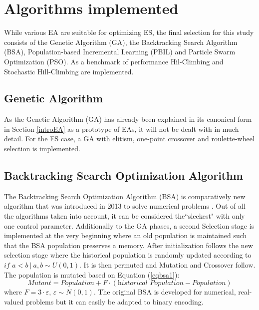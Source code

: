 \section{Algorithms implemented}
\label{alg}
While various EA are suitable for optimizing ES, the final selection for this study consists of the Genetic Algorithm (GA), the Backtracking Search Algorithm (BSA), Population-based Incremental Learning (PBIL) and Particle Swarm Optimization (PSO). As a benchmark of performance Hil-Climbing and Stochastic Hill-Climbing are implemented.

\subsection{Genetic Algorithm}
As the Genetic Algorithm (GA) has already been explained in its canonical form in Section \ref{introEA} as a prototype of EAs, it will not be dealt with in much detail. For the ES case, a GA with elitism, one-point crossover and roulette-wheel selection is implemented.


\subsection{Backtracking Search Optimization Algorithm}
The Backtracking Search Optimization Algorithm (BSA) is comparatively new algorithm that was introduced in 2013 to solve numerical problems \citep{civicioglu2013backtracking}. Out of all the algorithms taken into account, it can be considered the``sleekest" with only one control parameter. Additionally to the GA phases, a second Selection stage is implemented at the very beginning where an old population is maintained such that the BSA population preserves a memory. 
After initialization follows the new selection stage where the historical population is randomly updated according to $\textit{if } a < b  \:|\: a,b \sim U(0,1 )$. It is then permuted and Mutation and Crossover follow. The population is mutated based on Equation (\ref{eqbsa1}):
\begin{equation} \label{eqbsa1}
\textit{Mutant} = \textit{Population} + F \cdot (\textit{historical Population} - \textit{Population})
\end{equation}
where $F = 3 \cdot \varepsilon$, $\varepsilon \sim N(0,1)$.
The original BSA is developed for numerical, real-valued problems but it can easily be adapted to binary encoding.

